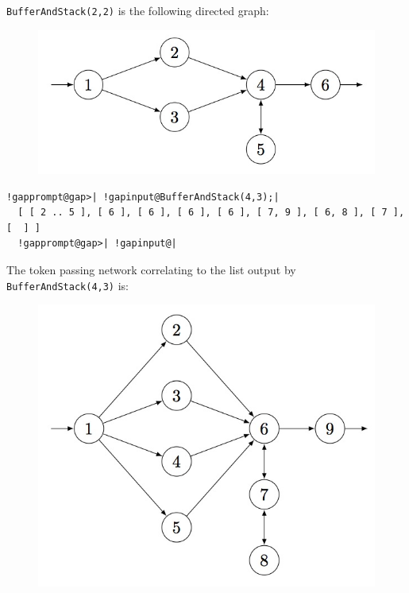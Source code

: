 \documentclass[a4paper,11pt]{report}
\begin{document}
{{{      \texttt{BufferAndStack(2,2)} is the following directed graph:
      \begin{figure}[H] \begin{center} \leavevmode \includegraphics[scale=0.75]{img/bs22.jpg} \end{center} \end{figure}
      
\begin{Verbatim}[commandchars=!@|,fontsize=\small,frame=single,label=Example]
  !gapprompt@gap>| !gapinput@BufferAndStack(4,3);|
  [ [ 2 .. 5 ], [ 6 ], [ 6 ], [ 6 ], [ 6 ], [ 7, 9 ], [ 6, 8 ], [ 7 ], [  ] ]
  !gapprompt@gap>| !gapinput@|
\end{Verbatim}
 
      The token passing network correlating to the list output by \texttt{BufferAndStack(4,3)} is:
      \begin{figure}[H] \begin{center} \leavevmode \includegraphics[scale=0.75]{img/bs43.jpg} \end{center} \end{figure}
      }

 }

 }
\end{document}

